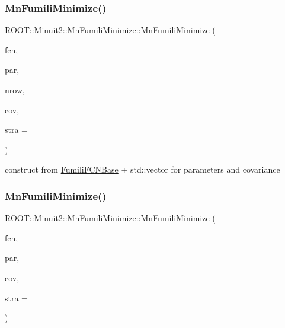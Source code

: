 \subsubsection{\texorpdfstring{MnFumiliMinimize()}{MnFumiliMinimize()}\hspace{0.1cm}{\footnotesize\ttfamily [2/21]}}
{\footnotesize\ttfamily R\+O\+O\+T\+::\+Minuit2\+::\+Mn\+Fumili\+Minimize\+::\+Mn\+Fumili\+Minimize (\begin{DoxyParamCaption}\item[{const \mbox{\hyperlink{classROOT_1_1Minuit2_1_1FumiliFCNBase}{Fumili\+F\+C\+N\+Base}} \&}]{fcn,  }\item[{const std\+::vector$<$ double $>$ \&}]{par,  }\item[{unsigned int}]{nrow,  }\item[{const std\+::vector$<$ double $>$ \&}]{cov,  }\item[{unsigned int}]{stra = {} }\end{DoxyParamCaption})\hspace{0.3cm}{\ttfamily [inline]}}



construct from \mbox{\hyperlink{classROOT_1_1Minuit2_1_1FumiliFCNBase}{Fumili\+F\+C\+N\+Base}} + std\+::vector for parameters and covariance 

\mbox{\label{classROOT_1_1Minuit2_1_1MnFumiliMinimize_a48eae3f1c5b8eef3b6940d3fd5d26af8}} 
\subsubsection{\texorpdfstring{MnFumiliMinimize()}{MnFumiliMinimize()}\hspace{0.1cm}{\footnotesize\ttfamily [3/21]}}
{\footnotesize\ttfamily R\+O\+O\+T\+::\+Minuit2\+::\+Mn\+Fumili\+Minimize\+::\+Mn\+Fumili\+Minimize (\begin{DoxyParamCaption}\item[{const \mbox{\hyperlink{classROOT_1_1Minuit2_1_1FumiliFCNBase}{Fumili\+F\+C\+N\+Base}} \&}]{fcn,  }\item[{const std\+::vector$<$ double $>$ \&}]{par,  }\item[{const \mbox{\hyperlink{classROOT_1_1Minuit2_1_1MnUserCovariance}{Mn\+User\+Covariance}} \&}]{cov,  }\item[{unsigned int}]{stra = {} }\end{DoxyParamCaption})\hspace{0.3cm}{\ttfamily [inline]}}



